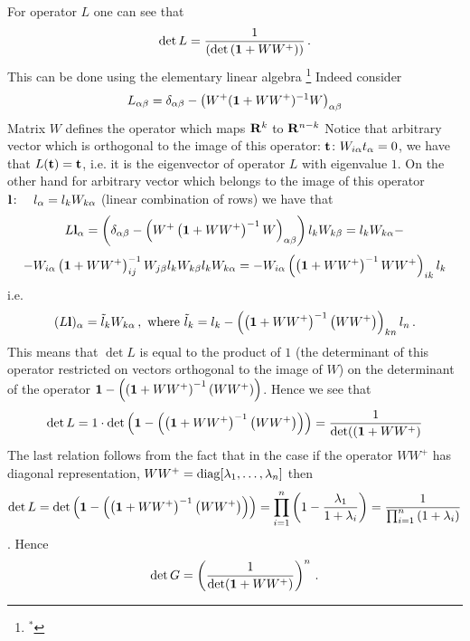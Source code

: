 For operator $L$ one can see that
          $$
\det L=  {1\over 
        \left(
   \det 
         \left( {\bf 1}+WW^+\right)
       \right)
         }\,.
           $$
This can be done using 
the elementary linear algebra
\footnote{$^*$}
{Indeed consider
                  $$
 L_{\alpha\beta}=
  \delta_{\alpha\beta}-\left(W^+({\bf 1}+WW^+)^{-1}W\right)_{\alpha\beta}
                  $$
Matrix $W$ defines the operator 
which maps ${\bf R}^k$  to ${\bf R}^{n-k}$
Notice that  arbitrary vector which is orthogonal 
to the image of this operator:
             $
{\bf t}\colon W_{i\alpha}t_\alpha=0
             $, we have that
$L({\bf t})={\bf t}$, i.e. it  
is the eigenvector of operator $L$
with eigenvalue $1$.
On the other hand 
for arbitrary vector which belongs to 
the image of this operator
                $
{\bf l}\colon \quad l_\alpha=l_k W_{k\alpha}$
(linear combination of rows)
we have that
                     $$
L{\bf l}_\alpha=
 \left 
(\delta_{\alpha\beta}-\left(W^+\left({\bf 1}+WW^+\right)^{-1}W\right)_{\alpha\beta}
\right)l_k W_{k\beta}=l_k W_{k\alpha}-
                      $$
                       $$
  -W_{i \alpha}\left({\bf 1}+WW^+\right)^{-1}_{ij}W_{j\beta}l_k W_{k\beta}
    l_k W_{k\alpha}               =
  -W_{i \alpha}\left(\left({\bf 1}+WW^+\right)^{-1}
               WW^+\right)_{ik}l_k 
                     $$
i.e.
                  $$
(L{\bf l})_\alpha=\tilde l_k W_{k\alpha}\,,\,\,
{\rm where}\,\,
        \tilde l_k=
    l_k-  \left(\left({\bf 1}+WW^+\right)^{-1}
\left(WW^+\right)\right)_{kn}l_n\,.
                  $$
This means that $\det L$ is equal to the product of
$1$ (the determinant of this operator restricted on vectors orthogonal
to the image of $W$) on the determinant of the operator
     ${\bf 1}-\left(\left({\bf 1}+WW^+\right)^{-1}
\left(WW^+\right)\right)$. Hence we see that
                  $$
\det L=1\cdot 
            \det
                \left(
       {\bf 1}-\left(
 \left({\bf 1}+WW^+\right)^{-1}
\left(WW^+\right)\right)
              \right)
     ={1\over \det(\left({\bf 1}+WW^+\right)}
                    $$
The last relation follows from the fact  that in
the case if the operator $WW^+$ has diagonal representation,
  $WW^+={\rm diag}[\lambda_1,\dots,\lambda_n]$ then
           $$
\det L=      \det
                \left(
       {\bf 1}-\left(
 \left({\bf 1}+WW^+\right)^{-1}
\left(WW^+\right)\right)
              \right)=
\prod_{i=1}^n
        \left(
       1-{\lambda_1\over 1+\lambda_i}
          \right)
         =
      {1\over \prod_{i=1}^n \left(1+\lambda_i\right)}
           $$
}.
Hence
              $$
\det G=
       \left(
{1\over  {\det ({\bf 1}+WW^+) }}
       \right)^{n}\,.
                 $$

